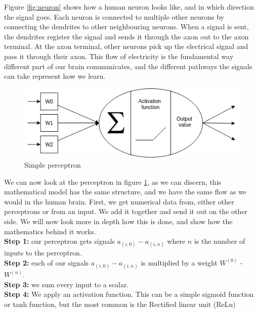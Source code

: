 Figure \ref{fig:neuron} shows how a human neuron looks like, and in which direction the signal goes. Each neuron is connected to multiple other neurons by connecting the dendrites to other neighbouring neurons. 
When a signal is sent, the dendrites register the signal and sends it through the axon out to the axon terminal. At the axon terminal, other neurons pick up the electrical signal and pass it through their axon.
This flow of electricity is the fundamental way different part of our brain communicates, and the different pathways the signals can take represent how we learn. 

\begin{figure}[h]
        \centering
        \includegraphics[scale=0.5]{background/figures/perceptron.png}
        \caption{Simple perceptron}
    \label{fig:perceptron}
\end{figure}

We can now look at the perceptron in figure \ref{fig:perceptron}, as we can discern, this mathematical model has the same structure, and we have the same flow as we would in the human brain. 
First, we get numerical data from, either other perceptrons or from an input. We add it together and send it out on the other side. We will now look more in depth how this is done, and show how the mathematics behind it works. \\

\textbf{Step 1:} our perceptron gets signals $a_{(i,0)}-a_{(i,n)}$ where $n$ is the number of inputs to the perceptron.\\

\textbf{Step 2:} each of our signals $a_{(i,0)}-a_{(i,n)}$ is multiplied by a weight $W^{(0)}$ -  $W^{(n)}$. \\

\textbf{Step 3:} we sum every input to a scalar. \\

\textbf{Step 4:} We apply an activation function. This can be a simple sigmoid function or tanh function, but the most common is the Rectified linear unit (ReLu)  \\ 

